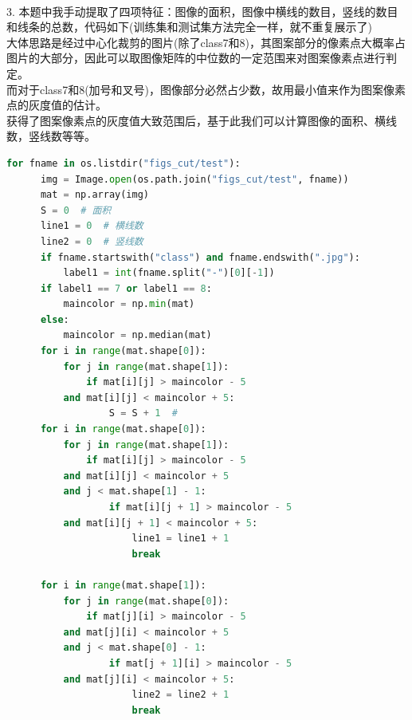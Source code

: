 \documentclass[answers]{exam}  %
\begin{document}
\begin{questions}
~\\
3. 本题中我手动提取了四项特征：图像的面积，图像中横线的数目，竖线的数目和线条的总数，代码如下(训练集和测试集方法完全一样，就不重复展示了)\\
大体思路是经过中心化裁剪的图片(除了class7和8)，其图案部分的像素点大概率占图片的大部分，因此可以取图像矩阵的中位数的一定范围来对图案像素点进行判定。\\
而对于class7和8(加号和叉号)，图像部分必然占少数，故用最小值来作为图案像素点的灰度值的估计。\\
获得了图案像素点的灰度值大致范围后，基于此我们可以计算图像的面积、横线数，竖线数等等。
\newpage
\begin{lstlisting}[language={Python}]
  for fname in os.listdir("figs_cut/test"):
	  img = Image.open(os.path.join("figs_cut/test", fname))
      mat = np.array(img)
      S = 0  # 面积
      line1 = 0  # 横线数
      line2 = 0  # 竖线数
      if fname.startswith("class") and fname.endswith(".jpg"):
          label1 = int(fname.split("-")[0][-1])
      if label1 == 7 or label1 == 8:
          maincolor = np.min(mat)
      else:
          maincolor = np.median(mat)
      for i in range(mat.shape[0]):
          for j in range(mat.shape[1]):
              if mat[i][j] > maincolor - 5 
	      and mat[i][j] < maincolor + 5:
                  S = S + 1  #
      for i in range(mat.shape[0]):
          for j in range(mat.shape[1]):
              if mat[i][j] > maincolor - 5 
		  and mat[i][j] < maincolor + 5 
		  and j < mat.shape[1] - 1:
                  if mat[i][j + 1] > maincolor - 5 
		  and mat[i][j + 1] < maincolor + 5:
                      line1 = line1 + 1
                      break

      for i in range(mat.shape[1]):
          for j in range(mat.shape[0]):
              if mat[j][i] > maincolor - 5 
		  and mat[j][i] < maincolor + 5 
		  and j < mat.shape[0] - 1:
                  if mat[j + 1][i] > maincolor - 5 
		  and mat[j][i] < maincolor + 5:
                      line2 = line2 + 1
                      break


\end{lstlisting}
\end{questions}
\end{document}
